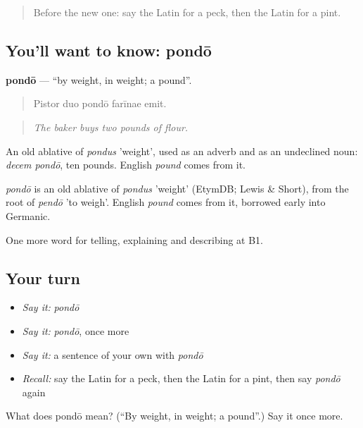 \begin{quote}
Before the new one: say the Latin for a peck, then the Latin for a pint.
\end{quote}

\subsection*{You'll want to know: pondō}
\textbf{pondō} — \textquotedblleft{}by weight, in weight; a pound\textquotedblright{}.

\begin{quote}
Pistor duo pondō farīnae emit.
\end{quote}

\begin{quote}
\emph{The baker buys two pounds of flour.}
\end{quote}

An old ablative of \emph{pondus} 'weight', used as an adverb and as an undeclined noun: \emph{decem pondō}, ten pounds. English \emph{pound} comes from it.

\begin{cousinweb}
\emph{pondō} is an old ablative of \emph{pondus} 'weight' (EtymDB; Lewis \& Short), from the root of \emph{pendō} 'to weigh'. English \emph{pound} comes from it, borrowed early into Germanic.
\end{cousinweb}

\begin{grammarlens}[title={What you've built}]
One more word for telling, explaining and describing at B1.
\end{grammarlens}

\subsection*{Your turn}
\begin{itemize}
\raggedright
  \item \emph{Say it:} \emph{pondō}
  \item \emph{Say it:} \emph{pondō}, once more
  \item \emph{Say it:} a sentence of your own with \emph{pondō}
  \item \emph{Recall:} say the Latin for a peck, then the Latin for a pint, then say \emph{pondō} again
\end{itemize}

\begin{tcolorbox}[breakable,colback=teal!4,colframe=teal!35!black,title={Before you move on}]
What does pondō mean? (\textquotedblleft{}By weight, in weight; a pound\textquotedblright{}.) Say it once more.
\end{tcolorbox}
